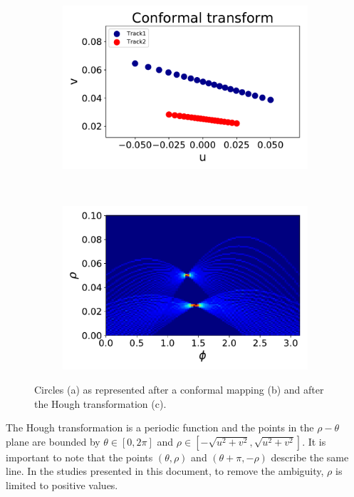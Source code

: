 \begin{figure}[ht]
\begin{subfigure}[b]{0.3\textwidth}
    \end{subfigure}
		~ %
		\begin{subfigure}[b]{0.3\textwidth}
					\includegraphics[width=\textwidth]{figures/circle_CT.pdf}
					\caption{}
			\end{subfigure}
			~ %
			\begin{subfigure}[b]{0.3\textwidth}
						\includegraphics[width=\textwidth]{figures/circle_HT.pdf}
						\caption{}
				\end{subfigure}
	\label{HTcircle}
	\caption{Circles (a) as represented after a conformal mapping (b) and after the Hough transformation (c).}
\end{figure}

The Hough transformation is a periodic function and the points in the $\rho-\theta$ plane are bounded by $\theta \in \left[0, 2\pi\right]$ and $\rho \in \left[-\sqrt{u^2+v^2}, \sqrt{u^2+v^2}\right]$. It is important to note that the points $(\theta, \rho)$ and $(\theta+\pi, -\rho)$ describe the same line. In the studies presented in this document, to remove the ambiguity, $\rho$ is limited to positive values.


